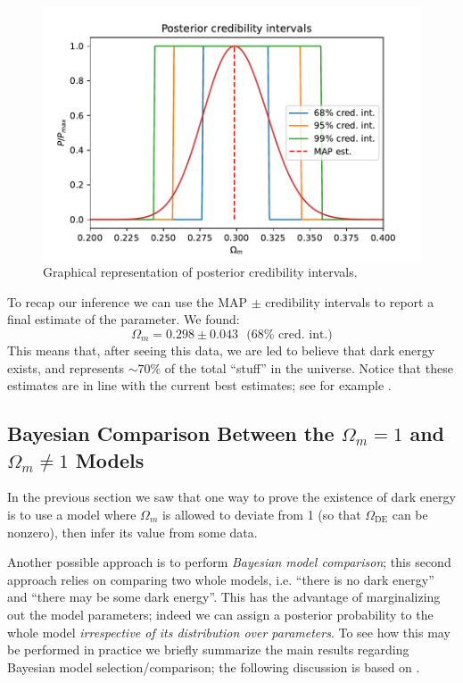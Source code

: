 \begin{figure}[H]
    \centering
    \includegraphics[width=\textwidth]{img/cred_intervals.pdf}
    \caption{Graphical representation of posterior credibility intervals.}
\end{figure}

To recap our inference we can use the MAP $\pm$ credibility intervals to report a final estimate of the parameter.
We found:
\begin{equation*}
    \Omega_m = 0.298 \pm 0.043 \ \ \ \text{($68\%$ cred. int.)}
\end{equation*}
This means that, after seeing this data, we are led to believe that dark energy exists, and represents $\sim 70\%$ of the total ``stuff'' in the universe.
Notice that these estimates are in line with the current best estimates; see for example \cite{dark_energy_data}.


\subsection{Bayesian Comparison Between the $\Omega_m=1$ and $\Omega_m\neq 1$ Models}
In the previous section we saw that one way to prove the existence of dark energy is to use a model where $\Omega_m$ is allowed to deviate from 1 (so that $\Omega_{\text{DE}}$ can be nonzero), then infer its value from some data.

Another possible approach is to perform \emph{Bayesian model comparison}; this second approach relies on comparing two whole models, i.e. ``there is no dark energy'' and ``there may be some dark energy''. This has the advantage of marginalizing out the model parameters; indeed we can assign a posterior probability to the whole model \emph{irrespective of its distribution over parameters}.
To see how this may be performed in practice we briefly summarize the main results regarding Bayesian model selection/comparison; the following discussion is based on \cite{mckay}.

